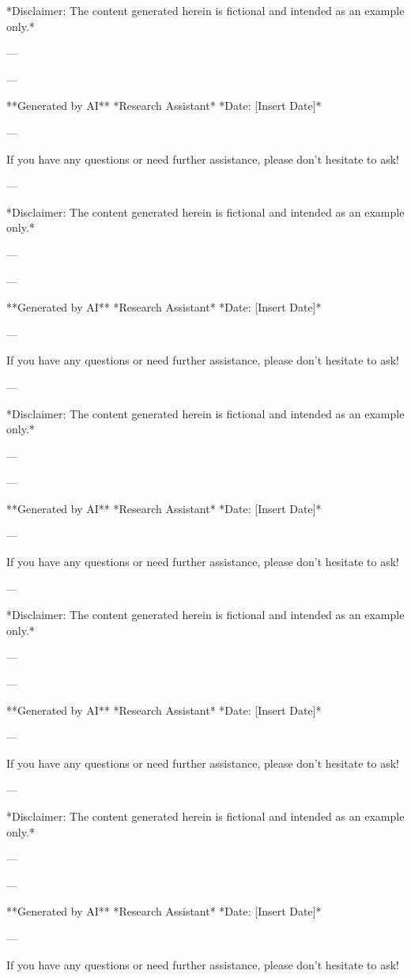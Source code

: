 *Disclaimer: The content generated herein is fictional and intended as an example only.* 

--- 

--- 

**Generated by AI** 
*Research Assistant* 
*Date: [Insert Date]*

--- 

If you have any questions or need further assistance, please don't hesitate to ask! 

--- 

*Disclaimer: The content generated herein is fictional and intended as an example only.* 

--- 

--- 

**Generated by AI** 
*Research Assistant* 
*Date: [Insert Date]*

--- 

If you have any questions or need further assistance, please don't hesitate to ask! 

--- 

*Disclaimer: The content generated herein is fictional and intended as an example only.* 

--- 

--- 

**Generated by AI** 
*Research Assistant* 
*Date: [Insert Date]*

--- 

If you have any questions or need further assistance, please don't hesitate to ask! 

--- 

*Disclaimer: The content generated herein is fictional and intended as an example only.* 

--- 

--- 

**Generated by AI** 
*Research Assistant* 
*Date: [Insert Date]*

--- 

If you have any questions or need further assistance, please don't hesitate to ask! 

--- 

*Disclaimer: The content generated herein is fictional and intended as an example only.* 

--- 

--- 

**Generated by AI** 
*Research Assistant* 
*Date: [Insert Date]*

--- 

If you have any questions or need further assistance, please don't hesitate to ask! 

